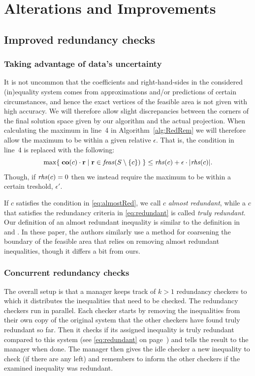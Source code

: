 \section{Alterations and Improvements}\label{sec:improvements}
\subsection{Improved redundancy checks}
\subsubsection{Taking advantage of data's uncertainty}\label{sec:uncertainty} 
It is not uncommon that the coefficients and right-hand-sides in the considered (in)equality system comes from approximations and/or predictions of certain circumstances, and hence the exact vertices of the feasible area is not given with high accuracy. We will therefore allow slight discrepancies between the corners of the final solution space given by our algorithm and the actual projection. 
When calculating the maximum in line~4 in Algorithm~\ref{alg:RedRem} we will therefore allow the maximum to be within a given relative $\epsilon$. That is, the condition in line~4 is replaced with the following:
\begin{equation}\label{eq:almostRed}
\max\{\;{\mathbf{co}(c)\cdot\mathbf{r}}\;|\;{\mathbf{r}\in \mathit{feas}(S\setminus\{c\})}\;\}\leq \mathit{rhs}(c) + \epsilon\cdot |\mathit{rhs}(c)|.
\end{equation}
Though, if $\mathit{rhs}(c)=0$ then we instead require the maximum to be within a certain treshold, $\epsilon'$. 

If $c$ satisfies the condition in \eqref{eq:almostRed}, we call $c$ \emph{almost redundant}, while a $c$ that satisfies the redundancy criteria in \eqref{eq:redundant} is called \emph{truly redundant}. Our definition of an almost redundant inequality is similar to the definition in \cite{lukatskii08} and \cite{shapot12}. In these paper, the authors similarly use a method for coarsening the boundary of the feasible area that relies on removing almost redundant inequalities, though it differs a bit from ours.  

\subsubsection{Concurrent redundancy checks}
The overall setup is that a manager keeps track of $k>1$ redundancy checkers to which it distributes the inequalities that need to be checked. The redundancy checkers run in parallel. Each checker starts by removing the inequalities from their own copy of the original system that the other checkers have found truly redundant so far. Then it checks if its assigned inequality is truly redundant compared to this system (see \eqref{eq:redundant} on page~\pageref{eq:redundant}) and tells the result to the manager when done. The manager then gives the idle checker a new inequality to check (if there are any left) and remembers to inform the other checkers if the examined inequality was redundant.

